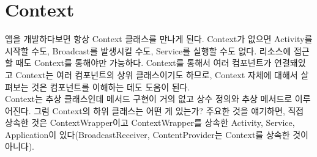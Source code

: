 \chapter{Context}
앱을 개발하다보면 항상 Context 클래스를 만나게 된다. Context가 없으면 Activity를 시작할 수도, Broadcast를 발생시킬 수도, Service를 실행할 수도 없다. 
리소스에 접근할 때도 Context를 통해야만 가능하다.
Context를 통해서 여러 컴포넌트가 연결돼있고 Context는 여러 컴포넌트의 상위 클래스이기도 하므로, Context 자체에 대해서 살펴보는 것은 컴포넌트를 이해하는 데도 도움이 된다.\\

Context는 추상 클래스인데 메서드 구현이 거의 없고 상수 정의와 추상 메서드로 이루어진다. 
그럼 Context의 하위 클래스는 어떤 게 있는가? 주요한 것을 얘기하면, 직접 상속한 것은 ContextWrapper이고 ContextWrapper를 상속한 Activity, Service, Application이 있다(BroadcastReceiver, ContentProvider는 Context를 상속한 것이 아니다).\\


